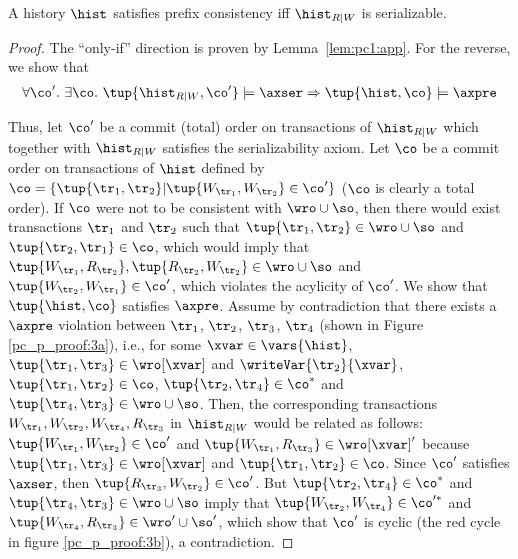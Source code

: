  \begin{theorem}\label{th:pc:app}
A history $\hist$ satisfies prefix consistency iff $\hist_{R|W}$ is serializable.
\end{theorem}
\begin{proof}
The ``only-if'' direction is proven by Lemma~\ref{lem:pc1:app}. For the reverse, we show that 
 \begin{align*}
  \forall \co'.\ \exists \co.\ \tup{\hist_{R|W}, \co'} \models \axser \Rightarrow \tup{\hist, \co} \models \axpre %
 \end{align*}
 
 Thus, let $\co'$ be a commit (total) order on transactions of $\hist_{R|W}$ which together with $\hist_{R|W}$ satisfies the serializability axiom.
 Let $\co$ be a commit order on transactions of $\hist$ defined by 
 $\co = \{\tup{\tr_1, \tr_2} | \tup{W_{\tr_1}, W_{\tr_2}} \in \co'\}$ ($\co$ is clearly a total order). If $\co$ were not to be consistent with $\wro \cup \so$, then there would exist transactions $\tr_1$ and $\tr_2$ such that  $\tup{\tr_1, \tr_2} \in \wro \cup \so$ and $\tup{\tr_2, \tr_1} \in \co$, which would imply that $\tup{W_{\tr_1}, R_{\tr_2}} , \tup{R_{\tr_2}, W_{\tr_2}} \in \wro \cup \so$ and $\tup{W_{\tr_2}, W_{\tr_1}} \in \co'$, which violates the acylicity of $\co'$. We show that $\tup{\hist, \co}$ satisfies $\axpre$. Assume by contradiction that there exists a $\axpre$ violation between $\tr_1$, $\tr_2$, $\tr_3$, $\tr_4$ (shown in Figure \ref{pc_p_proof:3a}), i.e., for some $\xvar \in \vars{\hist}$, $\tup{\tr_1, \tr_3} \in \wro[\xvar]$ and $\writeVar{\tr_2}{\xvar}$, $\tup{\tr_1, \tr_2} \in \co$, $\tup{\tr_2, \tr_4} \in \co^*$ and $\tup{\tr_4, \tr_3} \in \wro \cup \so$. Then, the corresponding transactions $W_{\tr_1}, W_{\tr_2}, W_{\tr_4}, R_{\tr_3}$ in $\hist_{R|W}$ would be related as follows: 
$\tup{W_{\tr_1}, W_{\tr_2}} \in \co'$ and $\tup{W_{\tr_1}, R_{\tr_3}} \in \wro[\xvar]'$ because $\tup{\tr_1, \tr_3} \in \wro[\xvar]$ and $\tup{\tr_1, \tr_2} \in \co$.
        Since $\co'$ satisfies $\axser$, then $\tup{R_{\tr_3}, W_{\tr_2}} \in \co'$.
        But $\tup{\tr_2, \tr_4} \in \co^*$ and $\tup{\tr_4, \tr_3} \in \wro \cup \so$ imply that $\tup{W_{\tr_2}, W_{\tr_4}} \in \co'^*$ and $\tup{W_{\tr_4}, R_{\tr_3}} \in \wro' \cup \so'$, which show that $\co'$ is cyclic (the red cycle in figure \ref{pc_p_proof:3b}), a contradiction.
\end{proof}
 
